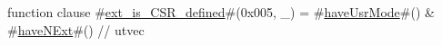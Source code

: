 function clause #\hyperref[sailRISCVzextzyiszyCSRzydefined]{ext\_is\_CSR\_defined}#(0x005, _) = #\hyperref[sailRISCVzhaveUsrMode]{haveUsrMode}#() & #\hyperref[sailRISCVzhaveNExt]{haveNExt}#() // utvec
